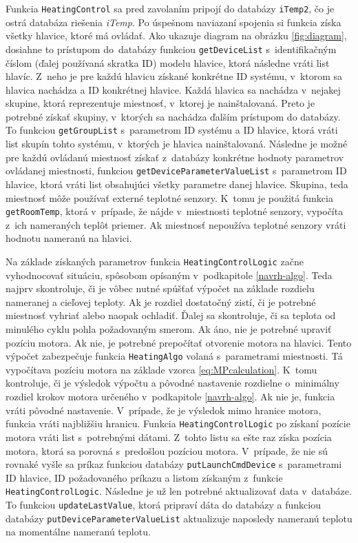 Funkcia \texttt{HeatingControl} sa pred zavolaním pripojí do databázy \texttt{iTemp2}, čo je ostrá databáza riešenia \emph{iTemp}. 
Po úspešnom naviazaní spojenia si funkcia získa všetky hlavice, ktoré má ovládať.
Ako ukazuje diagram na obrázku \ref{fig:diagram}, dosiahne to prístupom do~databázy funkciou \texttt{getDeviceList} s~identifikačným číslom (ďalej používaná skratka ID) modelu hlavice, ktorá následne vráti list hlavíc.  
Z~neho je pre každú hlavicu získané konkrétne ID systému, v~ktorom sa hlavica nachádza a ID konkrétnej hlavice.
Každá hlavica sa nachádza v~nejakej skupine, ktorá reprezentuje miestnosť, v~ktorej je nainštalovaná. Preto je potrebné získať skupiny, v~ktorých sa nachádza ďalším prístupom do databázy. 
To funkciou \texttt{getGroupList} s~parametrom ID systému a ID hlavice, ktorá vráti list skupín tohto systému, v~ktorých je hlavica nainštalovaná. 
Následne je možné pre každú ovládanú miestnosť získať z~databázy konkrétne hodnoty parametrov ovládanej miestnosti, funkciou \texttt{getDeviceParameterValueList} s~parametrom ID hlavice, ktorá vráti list obsahujúci všetky parametre danej hlavice. 
Skupina, teda miestnosť môže používať externé teplotné senzory. K~tomu je použitá funkcia \texttt{getRoomTemp}, ktorá v~prípade, že nájde v~miestnosti teplotné senzory, vypočíta z~ich nameraných teplôt priemer. 
Ak miestnosť nepoužíva teplotné senzory vráti hodnotu nameranú na hlavici.

Na základe získaných parametrov funkcia \texttt{HeatingControlLogic} začne vyhodnocovať situáciu, spôsobom opísaným v~podkapitole \ref{navrh-algo}. Teda najprv skontroluje, či je vôbec nutné spúšťať výpočet na základe rozdielu nameranej a cieľovej teploty. 
Ak je rozdiel dostatočný zistí, či je potrebné miestnosť vyhriať alebo  
naopak ochladiť. 
Ďalej sa skontroluje, či sa teplota od minulého cyklu pohla požadovaným smerom. Ak áno, nie je potrebné upraviť pozíciu motora. Ak nie, je potrebné prepočítať otvorenie motora na hlavici. 
Tento výpočet zabezpečuje funkcia \texttt{HeatingAlgo} volaná s~parametrami miestnosti. 
Tá vypočítava pozíciu motora na základe vzorca \ref{eq:MPcalculation}. 
K~tomu kontroluje, či je výsledok výpočtu a pôvodné nastavenie rozdielne o~minimálny rozdiel krokov motora určeného v~podkapitole \ref{navrh-algo}. 
Ak nie je, funkcia vráti pôvodné nastavenie. 
V~prípade, že je výsledok mimo hranice motora, funkcia vráti najbližšiu hranicu. 
Funkcia \texttt{HeatingControlLogic} po získaní pozície motora vráti list s~potrebnými dátami. 
Z~tohto listu sa ešte raz získa pozícia motora, ktorá sa porovná s~predošlou pozíciou motora. 
V~prípade, že nie sú rovnaké vyšle sa príkaz funkciou databázy \texttt{putLaunchCmdDevice} s~parametrami ID hlavice, ID požadovaného príkazu a listom získaným z~funkcie \texttt{HeatingControlLogic}. Následne je už len potrebné aktualizovať data v~databáze. To funkciou \texttt{updateLastValue}, ktorá pripraví dáta do databázy a funkciou databázy \texttt{putDeviceParameterValueList} aktualizuje naposledy nameranú teplotu na momentálne nameranú teplotu.

